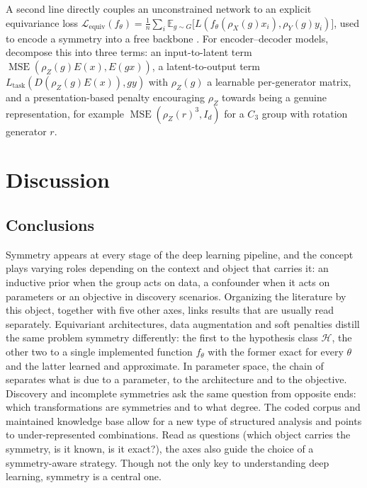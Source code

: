 \documentclass[mathematics,review,submit,moreauthors]{Definitions/mdpi}
\begin{document}
A second line directly couples an unconstrained network to an explicit equivariance loss $\mathcal{L}_{\mathrm{equiv}}(f_\theta)=\frac1n\sum_i\mathbb{E}_{g\sim G}\big[L(f_\theta(\rho_X(g)x_i),\rho_Y(g)y_i)\big]$, used to encode a symmetry into a free backbone \citep{escriche2025,elhag2026}.
For encoder--decoder models, \citet{ali2026} decompose this into three terms: an input-to-latent term $\operatorname{MSE}(\rho_Z(g)E(x),E(gx))$, a latent-to-output term $L_{\mathrm{task}}(D(\rho_Z(g)E(x)),gy)$ with $\rho_Z(g)$ a learnable per-generator matrix, and a presentation-based penalty encouraging $\rho_Z$ towards being a genuine representation, for example $\operatorname{MSE}(\rho_Z(r)^3,I_d)$ for a $C_3$ group with rotation generator $r$.

\section{Discussion}\label{sec:discussion}

\subsection{Conclusions}

Symmetry appears at every stage of the deep learning pipeline, and the concept plays varying roles depending on the context and object that carries it: an inductive prior when the group acts on data, a confounder when it acts on parameters or an objective in discovery scenarios.
Organizing the literature by this object, together with five other axes, links results that are usually read separately.
Equivariant architectures, data augmentation and soft penalties distill the same problem symmetry differently: the first to the hypothesis class $\mathcal{H}$, the other two to a single implemented function $f_\theta$ with the former exact for every $\theta$ and the latter learned and approximate.
In parameter space, the chain of  separates what is due to a parameter, to the architecture and to the objective.
Discovery and incomplete symmetries ask the same question from opposite ends: which transformations are symmetries and to what degree.
The coded corpus and maintained knowledge base allow for a new type of structured analysis and points to under-represented combinations.
Read as questions (which object carries the symmetry, is it known, is it exact?), the axes also guide the choice of a symmetry-aware strategy.
Though not the only key to understanding deep learning, symmetry is a central one.
\end{document}

